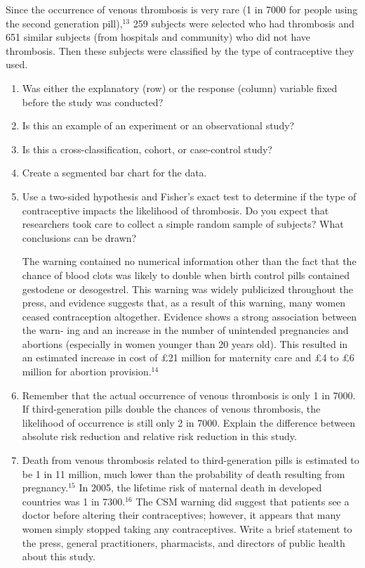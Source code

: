 \documentclass[
]{report}
\begin{document}
\begin{list}{E.}{ \setlength{\itemsep}{0.5em}}
Since the occurrence of venous thrombosis is very rare (1 in 7000 for people using the second
generation pill),$^{13}$ 259 subjects were selected who had thrombosis and 651 similar subjects (from
hospitals and community) who did not have thrombosis. Then these subjects were classified by the
type of contraceptive they used.

  \begin{enumerate}
    \item Was either the explanatory (row) or the response (column) variable fixed before the study was conducted?
    \item Is this an example of an experiment or an observational study?
    \item Is this a cross-classification, cohort, or case-control study?
    \item Create a segmented bar chart for the data.
    \item Use a two-sided hypothesis and Fisher’s exact test to determine if the type of contraceptive impacts the likelihood of thrombosis. Do you expect that researchers took care to collect a simple random sample of subjects? What conclusions can be drawn?
    
    The warning contained no numerical information other than the fact that the chance of blood clots
was likely to double when birth control pills contained gestodene or desogestrel. This warning was
widely publicized throughout the press, and evidence suggests that, as a result of this warning, many
women ceased contraception altogether. Evidence shows a strong association between the warn-
ing and an increase in the number of unintended pregnancies and abortions (especially in women
younger than 20 years old). This resulted in an estimated increase in cost of £21 million for maternity
care and £4 to £6 million for abortion provision.$^{14}$
    \item Remember that the actual occurrence of venous thrombosis is only 1 in 7000. If third-generation pills double the chances of venous thrombosis, the likelihood of occurrence is still only 2 in 7000. Explain the difference between absolute risk reduction and relative risk reduction in this study.
    \item Death from venous thrombosis related to third-generation pills is estimated to be 1 in 11 million, much lower than the probability of death resulting from pregnancy.$^{15}$ In 2005, the lifetime risk of maternal death in developed countries was 1 in 7300.$^{16}$ The CSM warning did suggest that patients see a doctor before altering their contraceptives; however, it appears that many women simply stopped taking any contraceptives. Write a brief statement to the press, general practitioners, pharmacists, and directors of public health about this study.
  \end{enumerate}


\end{list}
\end{document}
